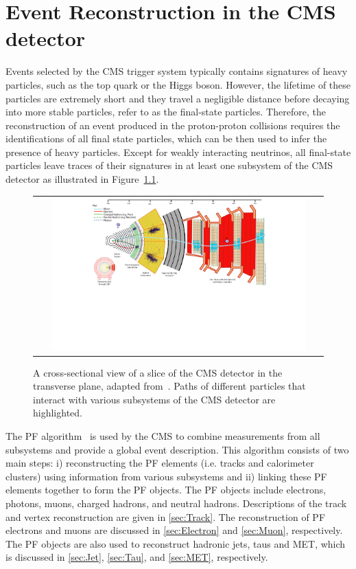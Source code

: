 \chapter{Event Reconstruction in the CMS detector}
\label{chap:Event}

Events selected by the \ac{CMS} trigger system typically contains signatures of heavy particles, such as the top quark or the Higgs boson. However, the lifetime of these particles are extremely short and they travel a negligible distance before decaying into more stable particles, refer to as the final-state particles. Therefore, the reconstruction of an event produced in the proton-proton collisions requires the identifications of all final state particles, which can be then used to infer the presence of heavy particles. Except for weakly interacting neutrinos, all final-state particles leave traces of their signatures in at least one subsystem of the \ac{CMS} detector as illustrated in Figure~\ref{fig:PF}.

\begin{figure}[tbh!]
 \begin{center}
 \begin{tabular}{c}
 \includegraphics[width=0.9\textwidth]{figures/Part2/Event/PF}
 \end{tabular}
 \caption{A cross-sectional view of a slice of the \ac{CMS} detector in the transverse plane, adapted from~\cite{Barney:2018}. Paths of different particles that interact with various subsystems of the \ac{CMS} detector are highlighted.}
 \label{fig:PF}
 \end{center}
\end{figure}

The \ac{PF} algorithm~\cite{CMS:2017yfk} is used by the \ac{CMS} to combine measurements from all subsystems and provide a global event description. This algorithm consists of two main steps: i) reconstructing the \ac{PF} elements (i.e. tracks and calorimeter clusters) using information from various subsystems and ii) linking these \ac{PF} elements together to form the \ac{PF} objects. The \ac{PF} objects include electrons, photons, muons, charged hadrons, and neutral hadrons. Descriptions of the track and vertex reconstruction are given in \autoref{sec:Track}. The reconstruction of \ac{PF} electrons and muons are discussed in \autoref{sec:Electron} and \autoref{sec:Muon}, respectively. The \ac{PF} objects are also used to reconstruct hadronic jets, taus and \ac{MET}, which is discussed in \autoref{sec:Jet}, \autoref{sec:Tau}, and \autoref{sec:MET}, respectively.

